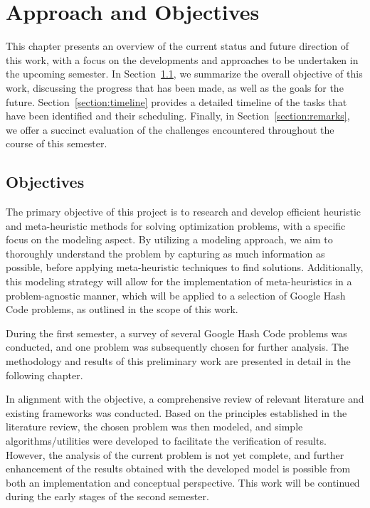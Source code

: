 \chapter{Approach and Objectives}
\label{chapter:approach-objectives}

This chapter presents an overview of the current status and future direction of
this work, with a focus on the developments and approaches to be undertaken in the
upcoming semester. In Section~\ref{section:objectives}, we summarize the overall
objective of this work, discussing the progress that has been made, as well as
the goals for the future. Section~\ref{section:timeline} provides a detailed
timeline of the tasks that have been identified and their scheduling. Finally,
in Section~\ref{section:remarks}, we offer a succinct evaluation of the
challenges encountered throughout the course of this semester.

\section{Objectives}
\label{section:objectives}

The primary objective of this project is to research and develop efficient
heuristic and meta-heuristic methods for solving optimization problems, with a
specific focus on the modeling aspect. By utilizing a modeling approach, we aim
to thoroughly understand the problem by capturing as much information as
possible, before applying meta-heuristic techniques to find solutions.
Additionally, this modeling strategy will allow for the implementation of
meta-heuristics in a problem-agnostic manner, which will be applied to a
selection of Google Hash Code problems, as outlined in the scope of this work.

During the first semester, a survey of several Google Hash Code problems was
conducted, and one problem was subsequently chosen for further analysis. The
methodology and results of this preliminary work are presented in detail in the
following chapter.

In alignment with the objective, a comprehensive review of relevant literature
and existing frameworks was conducted. Based on the principles established in
the literature review, the chosen problem was then modeled, and simple
algorithms/utilities were developed to facilitate the verification of results.
However, the analysis of the current problem is not yet complete, and further
enhancement of the results obtained with the developed model is possible from
both an implementation and conceptual perspective. This work will be continued
during the early stages of the second semester.

